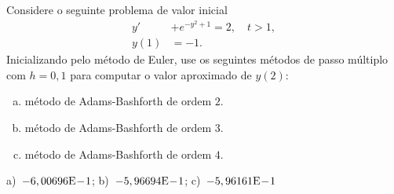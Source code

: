 \begin{exer}
  Considere o seguinte problema de valor inicial
  \begin{align}
    y' &+ e^{-y^2+1} = 2,\quad t>1,\\
    y(1) &= -1.
  \end{align}
Inicializando pelo método de Euler, use os seguintes métodos de passo múltiplo com $h=0,1$ para computar o valor aproximado de $y(2)$:
\begin{enumerate}[a)]
\item método de Adams-Bashforth de ordem $2$.
\item método de Adams-Bashforth de ordem $3$.
\item método de Adams-Bashforth de ordem $4$.
\end{enumerate}
\end{exer}
\begin{resp}
  a)~$-6,00696\mathrm{E}\!-\!1$; b)~$-5,96694\mathrm{E}\!-\!1$; c)~$-5,96161\mathrm{E}\!-\!1$
\end{resp}

